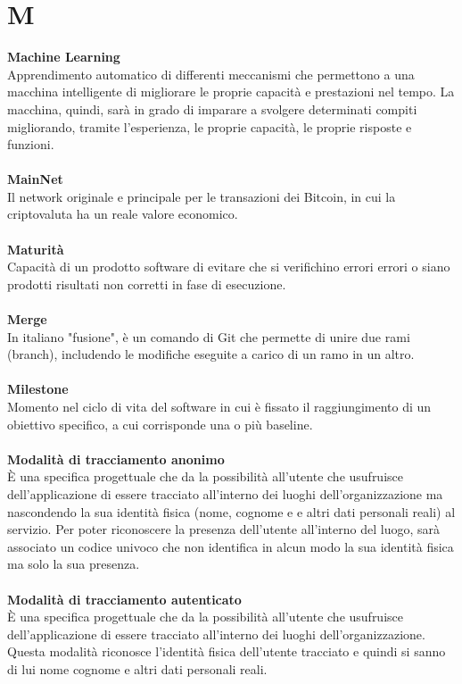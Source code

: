 \section{M}
\textbf{Machine Learning}\\
Apprendimento automatico di differenti meccanismi che permettono a una macchina intelligente di migliorare le proprie capacità e prestazioni nel tempo. La macchina, quindi, sarà in grado di imparare a svolgere determinati compiti migliorando, tramite l’esperienza, le proprie capacità, le proprie risposte e funzioni. \\ \\
\textbf{MainNet}\\
Il network originale e principale per le transazioni dei Bitcoin, in cui la criptovaluta ha un reale valore economico. \\ \\
\textbf{Maturità}\\
Capacità di un prodotto software di evitare che si verifichino errori errori o siano prodotti risultati non corretti in fase di esecuzione. \\ \\
\textbf{Merge}\\
In italiano "fusione", è un comando di Git che permette di unire due rami (branch), includendo le modifiche eseguite a carico di un ramo in un altro. \\ \\
\textbf{Milestone}\\
Momento nel ciclo di vita del software in cui è fissato il raggiungimento di un obiettivo specifico, a cui corrisponde una o più baseline.\\ \\
\textbf{Modalità di tracciamento anonimo}\\
È una specifica progettuale che da la possibilità all’utente che usufruisce dell’applicazione di essere tracciato all'interno dei luoghi dell'organizzazione ma nascondendo la sua identità fisica (nome, cognome e e altri dati personali reali) al servizio. Per poter riconoscere la presenza dell'utente all'interno del luogo, sarà associato un codice univoco che non identifica in alcun modo la sua identità fisica ma solo la sua presenza.\\ \\
\textbf{Modalità di tracciamento autenticato}\\
È una specifica progettuale che da la possibilità all’utente che usufruisce dell’applicazione di essere tracciato all'interno dei luoghi dell'organizzazione. Questa modalità riconosce l'identità fisica dell'utente tracciato e quindi si sanno di lui nome cognome e altri dati personali reali. \\ \\
